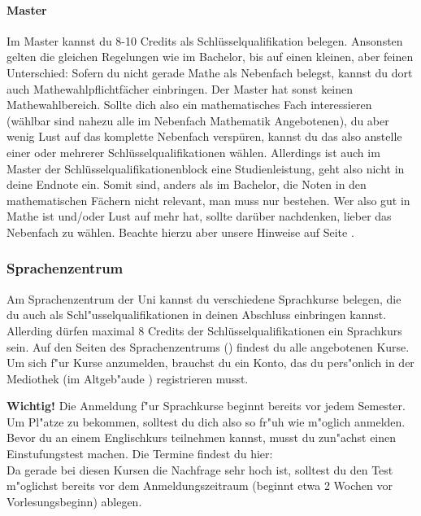 \paragraph*{Master}
Im Master kannst du 8-10 Credits als Schlüsselqualifikation
belegen. Ansonsten gelten die gleichen Regelungen wie im Bachelor, bis
auf einen kleinen, aber feinen Unterschied: Sofern du nicht gerade
Mathe als Nebenfach belegst, kannst du dort auch
Mathewahlpflichtfächer einbringen. Der Master hat sonst keinen
Mathewahlbereich. Sollte dich also ein mathematisches Fach
interessieren (wählbar sind nahezu alle im Nebenfach Mathematik Angebotenen), du
aber wenig Lust auf das komplette Nebenfach verspüren, kannst du das
also anstelle einer oder mehrerer Schlüsselqualifikationen
wählen. Allerdings ist auch im Master der
Schlüsselqualifikationenblock eine Studienleistung, geht also nicht in
deine Endnote ein. Somit sind, anders als im Bachelor, die Noten in
den mathematischen Fächern nicht relevant, man muss nur bestehen. Wer
also gut in Mathe ist und/oder Lust auf mehr hat, sollte darüber
nachdenken, lieber das Nebenfach zu wählen. Beachte hierzu aber unsere
Hinweise auf Seite \pageref{nebenfach}.
%
\subsubsection*{Sprachenzentrum}
Am Sprachenzentrum der Uni kannst du verschiedene Sprachkurse belegen,
die du auch als Schl"usselqualifikationen in deinen Abschluss
einbringen kannst. Allerding dürfen maximal 8 Credits der
Schlüsselqualifikationen ein Sprachkurs sein.
Auf den Seiten des Sprachenzentrums () findest du alle angebotenen Kurse.
Um sich f"ur Kurse anzumelden, brauchst du ein Konto, das du pers"onlich in der Mediothek (im Altgeb"aude ) registrieren musst.

\textbf{Wichtig!} Die Anmeldung f"ur Sprachkurse beginnt bereits vor jedem Semester.
Um Pl"atze zu bekommen, solltest du dich also so fr"uh wie m"oglich anmelden.
Bevor du an einem Englischkurs teilnehmen kannst, musst du zun"achst einen Einstufungstest machen.
Die Termine findest du hier: \\
Da gerade bei diesen Kursen die Nachfrage sehr hoch ist, solltest du den Test m"oglichst bereits vor dem Anmeldungszeitraum (beginnt etwa 2 Wochen vor Vorlesungsbeginn) ablegen.

